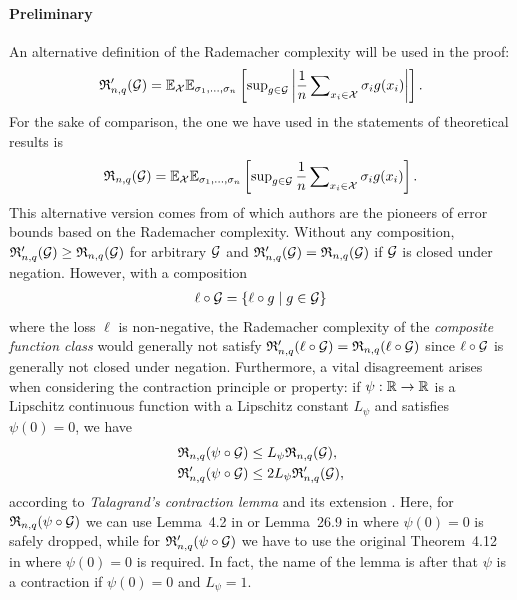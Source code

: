 \paragraph{Preliminary}%
An alternative definition of the Rademacher complexity will be used in the proof:
\begin{align*}
\mathfrak{R}'_{n,q}(\mathcal{G}) = \mathbb{E}_{\mathcal{X}}\mathbb{E}_{\sigma_1,\ldots,\sigma_n}\left[ \sup\nolimits_{g\in\mathcal{G}}
\left|\frac{1}{n}\sum\nolimits_{x_i\in\mathcal{X}}\sigma_ig(x_i)\right| \right].
\end{align*}
For the sake of comparison, the one we have used in the statements of theoretical results is
\begin{align*}
\mathfrak{R}_{n,q}(\mathcal{G}) = \mathbb{E}_{\mathcal{X}}\mathbb{E}_{\sigma_1,\ldots,\sigma_n}\left[ \sup\nolimits_{g\in\mathcal{G}}
\frac{1}{n}\sum\nolimits_{x_i\in\mathcal{X}}\sigma_ig(x_i) \right].
\end{align*}
This alternative version comes from \cite{koltchinskii01tit,bartlett02jmlr} of which authors are the pioneers of error bounds based on the Rademacher complexity. Without any composition, $\mathfrak{R}'_{n,q}(\mathcal{G})\ge\mathfrak{R}_{n,q}(\mathcal{G})$ for arbitrary $\mathcal{G}$ and $\mathfrak{R}'_{n,q}(\mathcal{G})=\mathfrak{R}_{n,q}(\mathcal{G})$ if $\mathcal{G}$ is closed under negation. However, with a composition \begin{align*}
\ell\circ\mathcal{G}=\{\ell\circ g\mid g\in\mathcal{G}\}
\end{align*}
where the loss $\ell$ is non-negative, the Rademacher complexity of the \emph{composite function class} would generally not satisfy $\mathfrak{R}'_{n,q}(\ell\circ\mathcal{G})=\mathfrak{R}_{n,q}(\ell\circ\mathcal{G})$ since $\ell\circ\mathcal{G}$ is generally not closed under negation. Furthermore, a vital disagreement arises when considering the contraction principle or property: if $\psi:\mathbb{R}\to\mathbb{R}$ is a Lipschitz continuous function with a Lipschitz constant $L_\psi$ and satisfies $\psi(0)=0$, we have
\begin{align*}
\mathfrak{R}_{n,q}(\psi\circ\mathcal{G}) &\le L_\psi\mathfrak{R}_{n,q}(\mathcal{G}),\\
\mathfrak{R}'_{n,q}(\psi\circ\mathcal{G}) &\le 2L_\psi\mathfrak{R}'_{n,q}(\mathcal{G}),
\end{align*}
according to \emph{Talagrand's contraction lemma} \citep{ledoux91PBS} and its extension \citep{mohri12FML,ssbd14UML}. Here, for $\mathfrak{R}_{n,q}(\psi\circ\mathcal{G})$ we can use Lemma~4.2 in \cite{mohri12FML} or Lemma~26.9 in \cite{ssbd14UML} where $\psi(0)=0$ is safely dropped, while for $\mathfrak{R}'_{n,q}(\psi\circ\mathcal{G})$ we have to use the original Theorem~4.12 in \cite{ledoux91PBS} where $\psi(0)=0$ is required. In fact, the name of the lemma is after that $\psi$ is a contraction if $\psi(0)=0$ and $L_\psi=1$.

